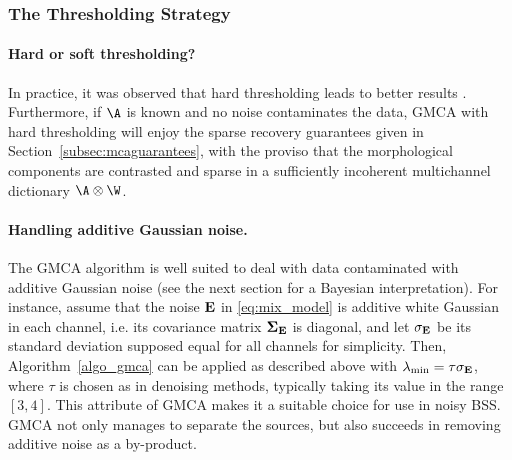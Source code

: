 \subsubsection{The Thresholding Strategy}


\paragraph*{Hard or soft thresholding?} In practice, it was observed that hard thresholding leads to better results \citep{starck:bobin06,starck:bobin07}. Furthermore, if $\A$ is known and no noise contaminates the data, GMCA with hard thresholding will enjoy the sparse recovery guarantees given in Section~\ref{subsec:mcaguarantees}, with the proviso that the morphological components are contrasted and sparse in a sufficiently incoherent multichannel dictionary ${\A} \otimes \W$. 

\paragraph*{Handling additive Gaussian noise.}
The GMCA algorithm is well suited to deal with data contaminated with additive Gaussian noise (see the next section for a Bayesian interpretation). For instance, assume that the noise $\bf E$ in \eqref{eq:mix_model} is additive white Gaussian in each channel, i.e. its covariance matrix ${\boldsymbol \Sigma}_{\bf E}$ is diagonal, and let $\sigma_{\bf E}$ be its standard deviation supposed equal for all channels for simplicity. Then, Algorithm~\ref{algo_gmca} can be applied as described above with $\lambda_{\min}=\tau\sigma_{\bf E}$, where $\tau$ is chosen as in denoising methods, typically taking its value in the range $[3,4]$. This attribute of GMCA makes it a suitable choice for use in noisy BSS. GMCA not only manages to separate the sources, but also succeeds in removing additive noise as a by-product.

